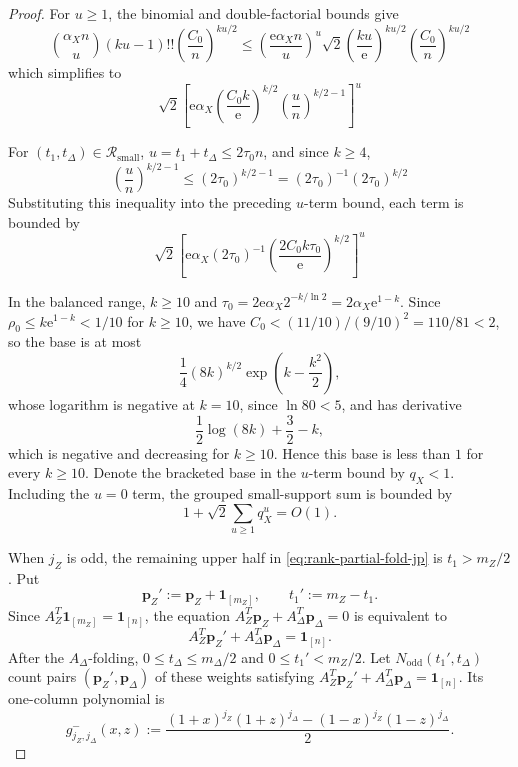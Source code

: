 \documentclass[11pt]{article}
\theoremstyle{definition}
\newcommand{\bp}{\mathbf p}
\newcommand{\ones}{\mathbf 1}
\begin{document}
\begin{proof}
For \(u\ge1\), the binomial and double-factorial bounds give
\begin{equation*}
\binom{\alpha_X n}{u}(ku-1)!!
\left(\frac{C_0}{n}\right)^{ku/2}
\le
\left(\frac{\mathrm{e}\alpha_X n}{u}\right)^u
\sqrt{2}\left(\frac{ku}{\mathrm{e}}\right)^{ku/2}
\left(\frac{C_0}{n}\right)^{ku/2}
\end{equation*}
which simplifies to
\begin{equation*}
\sqrt{2}\left[
\mathrm{e}\alpha_X
\left(\frac{C_0k}{\mathrm{e}}\right)^{k/2}
\left(\frac{u}{n}\right)^{k/2-1}
\right]^u
\end{equation*}

For \((t_1,t_\Delta)\in\mathcal R_{\mathrm{small}}\),
\(u=t_1+t_\Delta\le 2\tau_0 n\), and since \(k\ge4\),
\begin{equation*}
\left(\frac{u}{n}\right)^{k/2-1}
\le
(2\tau_0)^{k/2-1}
=(2\tau_0)^{-1}(2\tau_0)^{k/2}
\end{equation*}
Substituting this inequality into the preceding \(u\)-term bound, each term is bounded by
\begin{equation*}
\sqrt{2}\left[
\mathrm{e}\alpha_X(2\tau_0)^{-1}
\left(\frac{2C_0k\tau_0}{\mathrm{e}}\right)^{k/2}
\right]^u
\end{equation*}

In the balanced range, \(k\ge10\) and
\(\tau_0=2\mathrm{e}\alpha_X 2^{-k/\ln2}=2\alpha_X \mathrm{e}^{1-k}\).
Since \(\rho_0\le k\mathrm{e}^{1-k}<1/10\) for \(k\ge10\), we have
\(C_0<(11/10)/(9/10)^2=110/81<2\), so the base is at most
\[
\frac14(8k)^{k/2}\exp\!\left(k-\frac{k^2}{2}\right),
\]
whose logarithm is negative at \(k=10\), since \(\ln80<5\), and has derivative
\[
\frac12\log(8k)+\frac32-k,
\]
which is negative and decreasing for \(k\ge10\). Hence this base is less than \(1\) for every \(k\ge10\).
Denote the bracketed base in the \(u\)-term bound by \(q_X<1\). Including the \(u=0\) term, the grouped small-support sum is bounded by
\[
1+\sqrt2\sum_{u\ge1}q_X^u=O(1).
\]

When \(j_Z\) is odd, the remaining upper half in \eqref{eq:rank-partial-fold-jp} is \(t_1>m_Z/2\). Put
\[
\bp_Z':=\bp_Z+\ones_{[m_Z]},
\qquad
t_1':=m_Z-t_1.
\]
Since \(A_Z^T\ones_{[m_Z]}=\ones_{[n]}\), the equation
\(A_Z^T\bp_Z+A_\Delta^T\bp_\Delta=0\) is equivalent to
\[
A_Z^T\bp_Z'+A_\Delta^T\bp_\Delta=\ones_{[n]}.
\]
After the \(A_\Delta\)-folding, \(0\le t_\Delta\le m_\Delta/2\) and \(0\le t_1'<m_Z/2\). Let \(N_{\mathrm{odd}}(t_1',t_\Delta)\) count pairs \((\bp_Z',\bp_\Delta)\) of these weights satisfying \(A_Z^T\bp_Z'+A_\Delta^T\bp_\Delta=\ones_{[n]}\). Its one-column polynomial is
\[
g^-_{j_Z,j_\Delta}(x,z)
:=
\frac{(1+x)^{j_Z}(1+z)^{j_\Delta}-(1-x)^{j_Z}(1-z)^{j_\Delta}}{2}.
\]


\end{proof}
\end{document}
